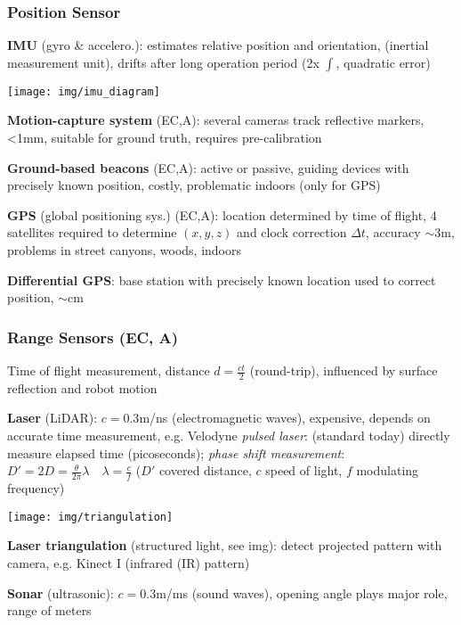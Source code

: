 \documentclass[fontsize=6pt]{scrartcl}
\begin{document}
\begin{multicols*}{4}
\subsubsection*{Position Sensor}
\textbf{IMU} (gyro \& accelero.): estimates	relative position and orientation, (inertial measurement unit), drifts after long operation period (2x $\int$, quadratic error)

\texttt{[image: img/imu\_diagram]}

\textbf{Motion-capture system} (EC,A): several cameras track reflective markers, <1mm, suitable for ground truth, requires pre-calibration

\textbf{Ground-based beacons} (EC,A): active or passive, guiding devices with precisely known position, costly, problematic indoors (only for GPS)

\textbf{GPS} (global positioning sys.) (EC,A): location determined by time of flight, 4 satellites required to determine $(x,y,z)$ and clock correction $\Delta t$, accuracy $\sim$3m, problems in street canyons, woods, indoors

\textbf{Differential GPS}: base station with precisely known location used to correct position, $\sim$cm

\subsubsection*{Range Sensors (EC, A)}

Time of flight measurement, distance $d= \frac{ct}{2}$ (round-trip), influenced by surface reflection and robot motion

\textbf{Laser} (LiDAR):	$c = 0.3$m/ns (electromagnetic waves), expensive, depends on accurate time measurement, e.g. Velodyne
\textit{pulsed laser}: (standard today) directly measure elapsed time (picoseconds); \textit{phase shift measurement}:
$D' = 2D = \frac{\theta}{2 \pi}\lambda\quad \lambda=\frac{c}{f}$ ($D'$ covered distance, $c$ speed of light, $f$ modulating frequency)

\begin{minipage}{0.58\linewidth}
\texttt{[image: img/triangulation]}
\end{minipage}
\begin{minipage}{0.42\linewidth}
\textbf{Laser triangulation} (structured light, see img): detect projected pattern with camera, e.g. Kinect I (infrared (IR) pattern)

\textbf{Sonar} (ultrasonic): $c = 0.3$m/ms (sound waves), opening angle plays major role, range of meters


\end{minipage}
\end{multicols*}
\end{document}
